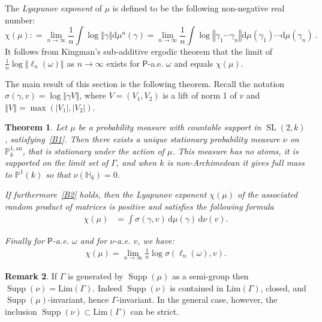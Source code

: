 \documentclass[10pt]{amsart}
\newtheorem{theo}{Theorem}[section]
\theoremstyle{definition}\newtheorem{defi}[theo]{Definition}\newtheorem{rema}[theo]{Remark}\newtheorem{exam}[theo]{Example}\newtheorem{exem}[theo]{Example}\newtheorem{nota}[theo]{Notation}
\DeclareMathOperator{\supp}{Supp}
\DeclareMathOperator{\SL}{SL}
\newcommand{\hh}{\mathbb{H}}
\newcommand{\prob}{\mathsf{P}}
\newcommand{\norm}[1]{\left\Vert#1\right\Vert}
\newcommand{\abs}[1]{\left\vert#1\right\vert}
\newcommand{\PP}{\mathbb{P}}
\newcommand{\berk}{{\mathbb{P}^{1, \mathrm{an}}_k}}
\newcommand{\SLk}{\SL(2,k)}
\newcommand*{\dd}{\mathrm{d}}
\newcommand*{\dmu}{\dd \mu}
\newcommand*{\dnu}{\dd \nu}
\begin{document}
The \emph{Lyapunov exponent} of $\mu$ is defined to be the following non-negative real number:
\begin{equation}\label{def:lyapunov exponent}
\chi (\mu) : = \lim _{n\rightarrow \infty} \frac{1}{n}\int
\log \norm{\gamma} \dmu^{n}(\gamma) = \lim _{n\rightarrow \infty} \frac{1}{n}\int \log \norm{ \gamma_1\cdots
\gamma_n} \dmu(\gamma_1)\cdots \dmu(\gamma_n)~.
\end{equation}
It follows from Kingman's sub-additive ergodic theorem that the limit of $ \frac1n \log \norm {\ell_n(\omega)}$ as $n\to\infty$ exists for $\prob$-a.e. $\omega$ and equals $\chi(\mu)$.


The main result of this section is the following theorem. Recall the notation $\sigma(\gamma, v) = \log\norm{\gamma V}$, where $V = (V_1, V_2)$ is a lift of norm 1 of $v$ and $\norm{V} = \max(\abs{V_1}, \abs{V_2})$.

\begin{theo}\label{thm:positive}
Let $\mu$ be a probability measure with countable support in $\SLk$, satisfying~\eqref{B1}. Then there exists a unique stationary probability measure $\nu$ on $\berk$, that is stationary under the action of $\mu$. This measure has no atoms, it is supported on the limit set of $\Gamma$, and when $k$ is non-Archimedean it gives full mass to $\PP^1(k)$ so that $\nu (\hh_k)=0$.

If furthermore~\eqref{B2} holds, then the Lyapunov exponent $\chi(\mu)$ of the associated random product of matrices is positive and satisfies the following formula
\begin{align}\label{eq:furstenberg}
\chi(\mu) & = \int \sigma(\gamma, v) \, \dmu(\gamma)\, \dnu(v).
\end{align}

Finally for $\prob$-a.e. $\omega$ and for $\nu$-a.e. $v$, we have:
\begin{align}
\chi(\mu) = \lim_{n\to\infty} \frac1n \log \sigma(\ell_n(\omega), v) \label{eq301}
.
\end{align}
\end{theo}

\begin{rema}
If $\Gamma$ is generated by $\supp(\mu)$ as a semi-group then $\supp(\nu) = \mathrm{Lim}(\Gamma)$. Indeed $\supp(\nu)$ is contained in $\mathrm{Lim}(\Gamma)$, closed, and $\supp(\mu)$-invariant, hence $\Gamma$-invariant. In the general case, however, the inclusion $\supp(\nu)\subset \mathrm{Lim}(\Gamma)$ can be strict.
\end{rema}
\end{document}
